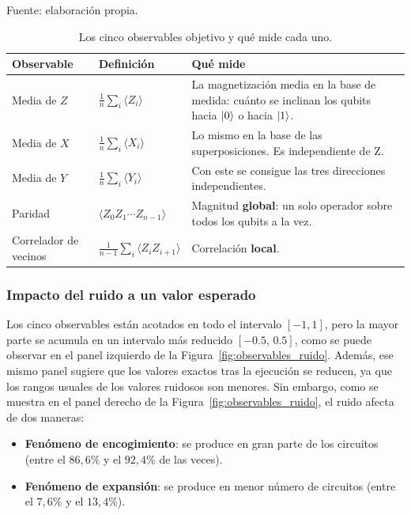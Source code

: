 \begin{table}[htbp]
    \centering
    \caption{Los cinco observables objetivo y qué mide cada uno.}
    \label{tab:observables}
    {\footnotesize
    Fuente: elaboración propia. \begin{tabular}{@{}llp{}@{}}
        \toprule
        \textbf{Observable} & \textbf{Definición} & \textbf{Qué mide} \\
        \midrule
        Media de $Z$ & $\frac{1}{n}\sum_{i} \langle Z_i \rangle$
            & La magnetización media en la base de medida: cuánto se inclinan los qubits
              hacia $\ket{0}$ o hacia $\ket{1}$. \\
        Media de $X$ & $\frac{1}{n}\sum_{i} \langle X_i \rangle$
            & Lo mismo en la base de las superposiciones. Es independiente de Z.\\
        Media de $Y$ & $\frac{1}{n}\sum_{i} \langle Y_i \rangle$
            & Con este se consigue las tres direcciones independientes. \\
        Paridad & $\langle Z_0 Z_1 \cdots Z_{n-1} \rangle$
            & Magnitud \textbf{global}: un solo operador sobre todos los qubits a la vez. \\
        Correlador de vecinos & $\frac{1}{n-1}\sum_{i} \langle Z_i Z_{i+1} \rangle$
            & Correlación \textbf{local}. \\
        \bottomrule
    \end{tabular}}
\end{table}

\subsubsection{Impacto del ruido a un valor esperado}
\label{sec:ruido_observable}

Los cinco observables están acotados en todo el intervalo $[-1,1]$, pero la mayor parte se acumula en un intervalo más reducido $[-0.5,\, 0.5]$, como se puede observar en el panel izquierdo de la Figura~\ref{fig:observables_ruido}. Además, ese mismo panel sugiere que los valores exactos tras la ejecución se reducen, ya que los rangos usuales de los valores ruidosos son menores. Sin embargo, como se muestra en el panel derecho de la Figura~\ref{fig:observables_ruido}, el ruido afecta de dos maneras:
\begin{itemize}
    \item \textbf{Fenómeno de encogimiento}: se produce en gran parte de los circuitos (entre el $86{,}6$\% y el $92{,}4$\% de las veces).
    \item \textbf{Fenómeno de expansión}: se produce en menor número de circuitos (entre el $7{,}6$\% y el $13{,}4$\%).
\end{itemize}

